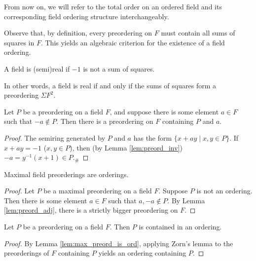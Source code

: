 From now on, we will refer to the total order on an ordered field and its corresponding field ordering structure interchangeably.

Observe that, by definition, every preordering on $F$ must contain all sums of squares in $F$. This yields an algebraic criterion for the existence of a field ordering.

\begin{definition}
  \label{def:semireal}
  \leanok
  A field is (semi)real if $-1$ is not a sum of squares.
\end{definition}

In other words, a field is real if and only if the sums of squares form a preordering $\Sigma F^2$.

\begin{lemma}
  \label{lem:preord_adj}
  \leanok
  Let $P$ be a preordering on a field $F$, and suppose there is some element $a\in F$ such that $-a\notin P$. Then there is a preordering on $F$ containing $P$ and $a$.
\end{lemma}
\begin{proof}
  \leanok
  The semiring generated by $P$ and $a$ has the form $\{x+ay\mid x,y\in P\}$. If $x+ay=-1$ ($x,y\in P$), then (by Lemma \ref{lem:preord_inv}) $-a=y^{-1}(x+1)\in P$.$_\#$
\end{proof}

\begin{lemma}
  \label{lem:max_preord_is_ord}
  \leanok
  Maximal field preorderings are orderings.
\end{lemma}
\begin{proof}
  \leanok
  Let $P$ be a maximal preordering on a field $F$. Suppose $P$ is not an ordering. Then there is some element $a\in F$ such that $a,-a\notin P$. By Lemma \ref{lem:preord_adj}, there is a strictly bigger preordering on $F$.
\end{proof}

\begin{lemma}
  \label{lem:preord_ext}
  \leanok
  Let $P$ be a preordering on a field $F$. Then $P$ is contained in an ordering.
\end{lemma}
\begin{proof}
  \leanok
  By Lemma \ref{lem:max_preord_is_ord}, applying Zorn's lemma to the preorderings of $F$ containing $P$ yields an ordering containing $P$.
\end{proof}

